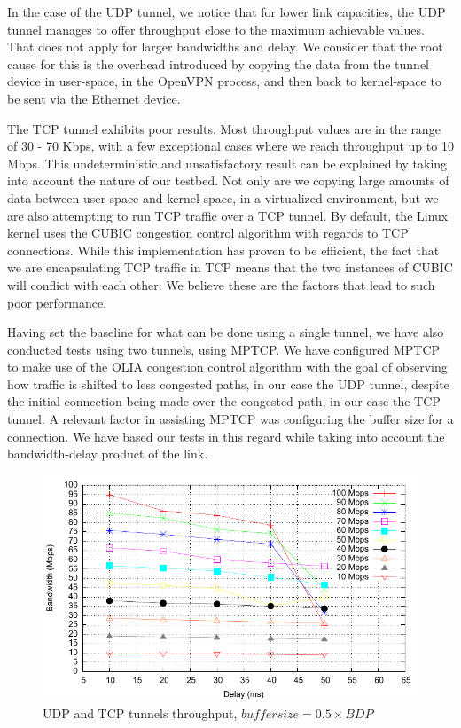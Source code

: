 In the case of the UDP tunnel, we notice that for lower link capacities, the
UDP tunnel manages to offer throughput close to the maximum achievable values.
That does not apply for larger bandwidths and delay. We consider that the root
cause for this is the overhead introduced by copying the data from the tunnel
device in user-space, in the OpenVPN process, and then back to kernel-space to
be sent via the Ethernet device.

The TCP tunnel exhibits poor results. Most throughput values are in the range
of 30 - 70 Kbps, with a few exceptional cases where we reach throughput up to
10 Mbps. This undeterministic and unsatisfactory result can be explained by
taking into account the nature of our testbed. Not only are we copying large
amounts of data between user-space and kernel-space, in a virtualized
environment, but we are also attempting to run TCP traffic over a TCP tunnel.
By default, the Linux kernel uses the CUBIC congestion control algorithm with
regards to TCP connections. While this implementation has proven to be
efficient, the fact that we are encapsulating TCP traffic in TCP means that
the two instances of CUBIC will conflict with each other. We believe these are the
factors that lead to such poor performance.

Having set the baseline for what can be done using a single tunnel, we have
also conducted tests using two tunnels, using MPTCP. We have configured MPTCP
to make use of the OLIA congestion control algorithm with the goal of
observing how traffic is shifted to less congested paths, in our case the UDP
tunnel, despite the initial connection being made over the congested path, in
our case the TCP tunnel. A relevant factor in assisting MPTCP was configuring
the buffer size for a connection. We have based our tests in this regard while
taking into account the bandwidth-delay product of the link.

\begin{figure}
  \centering
  \includegraphics[width=\textwidth]{img/test-mptcp-05}
  \caption{UDP and TCP tunnels throughput, $buffer size = 0.5 \times BDP$}
  \label{fig:mptcp-0.5}
\end{figure}

